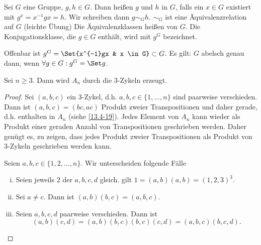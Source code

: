 \begin{df} \label{20.5-3}
	Sei $G$ eine Gruppe, $g, h \in G$.
	Dann heißen $g$ und $h$  in $G$, falls ein $x \in G$ existiert mit $g^x = x^{-1}gx = h$.
	Wir schreiben dann $g \sim_G h$.
	$\sim_G$ ist eine Äquivalenzrelation auf $G$ (leichte Übung)
	Die Äquivalenzklassen heißen  von $G$.
	Die Konjugationsklasse, die $g \in G$ enthält, wird mit $g^G$ bezeichnet.

	\begin{note}
		Offenbar ist $g^G = \Set{x^{-1}gx & x \in G} \subset G$.
		Es gilt: $G$ abelsch genau dann, wenn $\forall g\in G : g^G = \Set g$.
	\end{note}
\end{df}

\begin{lem} \label{20.5-4}
	Sei $n \ge 3$.
	Dann wird $A_n$ durch die $3$-Zykeln erzeugt.
	\begin{proof}
		Sei $(a,b,c)$ ein $3$-Zykel, d.h. $a, b, c \in \{1, \dotsc, n\}$ sind paarweise verschieden.
		Dann ist $(a,b,c) = (bc, ac)$ Produkt zweier Transpositionen und daher gerade, d.h. enthalten in $A_n$ (siehe \ref{13.4-19}).
		Jedes Element von $A_n$ kann wieder als Produkt einer geraden Anzahl von Transpositionen geschrieben werden.
		Daher genügt es, zu zeigen, dass jedes Produkt zweier Transpositionen als Produkt von $3$-Zykeln geschrieben werden kann.

		Seien $a, b, c \in \{1, 2, \dotsc, n\}$.
		Wir unterscheiden folgende Fälle
		\begin{enumerate}[i)]
			\item
				Seien jeweils $2$ der $a, b, c, d$ gleich.
				\OBdA gilt $1 = (a,b)(a,b) = (1,2,3)^3$.
			\item
				Sei $a \neq c$.
				Dann ist $(a,b)(b,c) = (a, b, c)$.
			\item
				Seien $a, b, c, d$ paarweise verschieden.
				Dann ist
				\[
					(a,b)(c,d) = (a,b)(b,c)(b,c)(c,d) = (a,b,c)(b,c,d).
				\]
		\end{enumerate}
	\end{proof}
\end{lem}

